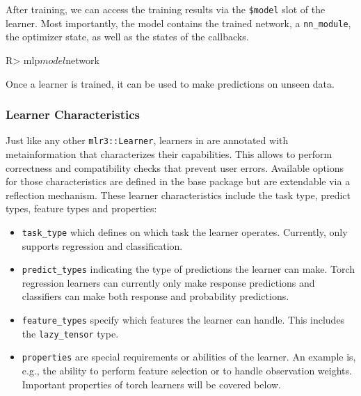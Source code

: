 \documentclass[article, nojss]{jss}
\theoremstyle{definition}
\begin{document}
After training, we can access the training results via the \texttt{\$model} slot of the learner.
Most importantly, the model contains the trained network, a \texttt{nn\_module}, the optimizer state, as well as the states of the callbacks.

\begin{CodeInput}
R> mlp$model$network
\end{CodeInput}

Once a learner is trained, it can be used to make predictions on unseen data.


\begin{CodeOutput}
\end{CodeOutput}

\subsubsection{Learner Characteristics}\label{sec:learner-characteristics}

Just like any other \texttt{mlr3::Learner}, learners in  are annotated with metainformation that characterizes their capabilities.
This allows  to perform correctness and compatibility checks that prevent user errors.
Available options for those characteristics are defined in the  base package but are extendable via a reflection mechanism.
These learner characteristics include the task type, predict types, feature types and properties:

\begin{itemize}
    \item \texttt{task\_type} which defines on which task the learner operates. Currently,  only supports regression and classification.
    \item \texttt{predict\_types} indicating the type of predictions the learner can make. Torch regression learners can currently only make response predictions and classifiers can make both response and probability predictions.
    \item \texttt{feature\_types} specify which features the learner can handle. This includes the \texttt{lazy\_tensor} type.
    \item \texttt{properties} are special requirements or abilities of the learner. An example is, e.g., the ability to perform feature selection or to handle observation weights. Important properties of torch learners will be covered below.
\end{itemize}
\end{document}
